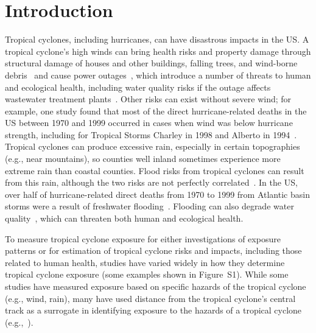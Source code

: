 \section*{Introduction}

Tropical cyclones, including hurricanes, can have disastrous impacts in the
\ac{US}. A tropical cyclone's high winds can bring health risks
and property damage through structural damage of houses and other buildings,
falling trees, and wind-borne debris~\citep{rappaport2000} and cause power
outages~\citep{liu2005, han2009}, which introduce a number of threats to human
and ecological health, including water quality risks if the outage affects
wastewater treatment plants~\citep{mallin2006}.  Other risks can exist without
severe wind; for example, one study found that most of the direct
hurricane-related deaths in the \ac{US} between 1970 and 1999 occurred in cases
when wind was below hurricane strength, including for Tropical Storms Charley
in 1998 and Alberto in 1994~\citep{rappaport2000}.  Tropical cyclones can
produce excessive rain, especially in certain topographies (e.g., near
mountains), so counties well inland sometimes experience more extreme rain than
coastal counties. Flood risks from tropical cyclones can result from this rain,
although the two risks are not perfectly correlated~\citep{chen2015}. In the
\ac{US}, over half of hurricane-related direct deaths from 1970 to 1999 from
Atlantic basin storms were a result of freshwater flooding~\citep{rappaport2000}. 
Flooding can also degrade water quality~\citep{mallin2006}, which can threaten both 
human and ecological health.

To measure tropical cyclone exposure for either investigations of exposure
patterns or for estimation of tropical cyclone risks and impacts, including
those related to human health, studies have varied widely in how they determine
tropical cyclone exposure (some examples shown in Figure~S1). While some
studies have measured exposure based on specific hazards of the tropical
cyclone (e.g., wind, rain), many have used distance from the tropical
cyclone's central track as a surrogate in identifying exposure to the hazards
of a tropical cyclone (e.g.,~\citet{czajkowski2011, tansel2010, kinney2008,
caillouet2008increase}).  

